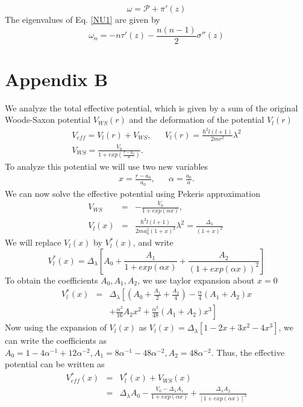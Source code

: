 \documentclass[12pt]{article}
\begin{document}
\begin{equation} \label{omega_def}
\omega=\mathcal{P} +\pi'(z)  
\end{equation}
The  eigenvalues of Eq. \eqref{NU1} are given by 
\begin{equation} \label{NU_eigenval}
	\omega_n = -n \tau'(z) - \frac{n(n-1)}{2} \sigma''(z)
\end{equation}

 \section*{Appendix B}
We analyze the   total  effective potential, which is given by a sum of the original Woods-Saxon potential $V_{WS} (r)$ and the deformation of the potential  $V_l (r)$  
\begin{eqnarray} 
	V_{eff} = V_l(r) + V_{WS}, && 
	 V_l(r) = \frac{\hbar^2 l(l+1)}{2mr^2} \lambda^2
\nonumber 	\\
	V_{WS} = \frac{V_0}{1+ exp(\frac{r-a_0}{a})}. && 
\end{eqnarray}
To analyze this potential we will use   two new variables  
\begin{eqnarray}
x = \frac{r- a_0}{a_0}, &&
\alpha = \frac{a_0}{a}.
\end{eqnarray}
 We can now solve the effective potential using   Pekeris approximation 
\begin{eqnarray}
V_{WS} &=& - \frac{V_0 }{1+ exp(\alpha x)}, ~\label{WS_x}
\\
V_l(x)  &=&  \frac{\hbar^2 l(l+1)}{2m a_0^2 (1+x)^2} \lambda^2 = \frac{\Delta_\lambda}{(1+x)^2} ~\label{Vl_x}
\end{eqnarray}
We will replace $V_l(x)$ by $V^*_l (x)$, and write 
\begin{equation} \label{vl_pek_1}
	V^*_l (x)= \Delta_\lambda \left[A_0 + \frac{A_1}{1+ exp(\alpha x)} + \frac{A_2}{(1+ exp(\alpha x))^2} \right]
\end{equation}
To obtain  the coefficients $ A_0,  A_1, A_2$, we use taylor expansion about   $x =0$  
\begin{eqnarray} \label{taylor}
	V^*_l (x) &=& \Delta_\lambda \left[ \left(A_0 + \frac{A_1}{2} +\frac{A_2}{4}\right) - \frac{\alpha}{4} \left( A_1+ A_2 \right) x \right.  \nonumber \\  && \left. + \frac{\alpha^2}{16} A_2 x^2 + \frac{\alpha^3}{48} \left(A_1 +A_2\right) x^3 \right]
\end{eqnarray}
Now using the   expansion of $V_l(x)$ as 
$ V_l(x)= \Delta_\lambda \left[1- 2x +3x^2 -4x^3 \right]$, we can write  the coefficients as  $
	A_0 = 1- {4}{\alpha}^{-1} + {12}{\alpha^{-2}},   A_1 = {8}{\alpha}^{-1} -{48}\alpha^{-2}, A_2 = {48}\alpha^{-2}
$.  
Thus, the effective potential can be written as 
\begin{eqnarray}\label{eff_pek}
	V^*_{eff}(x) &=& V^*_l(x) + V_{WS} (x)\nonumber \\ &=& \Delta_\lambda A_0 - \frac{V_0 - \Delta_\lambda A_1}{1+ exp(\alpha x)} + \frac{\Delta_\lambda A_2}{[1+ exp(\alpha x)]^2}
\end{eqnarray}
\end{document}
